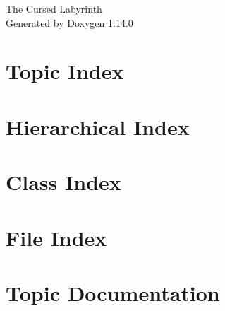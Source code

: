\documentclass[twoside]{book}
\newcommand{\+}{\discretionary{\mbox{\scriptsize$\hookleftarrow$}}{}{}}
\newcommand{\clearemptydoublepage}{%
    \newpage{\pagestyle{empty}\cleardoublepage}%
  }
\begin{document}
  \raggedbottom
    \hypersetup{pageanchor=false,
                bookmarksnumbered=true,
                pdfencoding=unicode
               }
  \begin{titlepage}
  \vspace*{7cm}
  \begin{center}%
  {\Large The Cursed Labyrinth}\\
  \vspace*{1cm}
  {\large Generated by Doxygen 1.14.0}\\
  \end{center}
  \end{titlepage}
  \clearemptydoublepage
  \tableofcontents
  \clearemptydoublepage
  \hypersetup{pageanchor=true}
\chapter{Topic Index}

\chapter{Hierarchical Index}

\chapter{Class Index}

\chapter{File Index}

\chapter{Topic Documentation}





\end{document}
